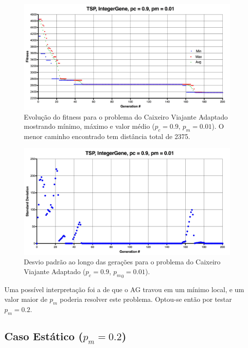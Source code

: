 \begin{figure}[ht!]
    \centering \includegraphics[width=1.0\textwidth]{tsp_001.jpg}
    \caption{Evolução do fitness para o problema do Caixeiro Viajante Adaptado mostrando mínimo, máximo e valor médio ($p_c=0.9$, $p_m=0.01$). O menor caminho encontrado tem distância total de 2375.}
    \label{fig:tsp001}
\end{figure}

\begin{figure}[ht!]
    \centering \includegraphics[width=1.0\textwidth]{tsp_001_std.jpg}
    \caption{Desvio padrão ao longo das gerações para o problema do Caixeiro Viajante Adaptado ($p_c=0.9$, ${p_m}_0=0.01$).}
    \label{fig:tsp001std}
\end{figure}

Uma possível interpretação foi a de que o AG travou em um mínimo local, e um valor maior de $p_m$ poderia resolver este problema. Optou-se então por testar $p_m = 0.2$.

\subsection{Caso Estático ($p_m = 0.2$)}

